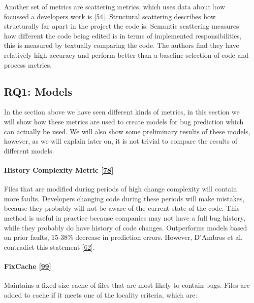 \documentclass[]{book}
\let\oldparagraph\paragraph
\renewcommand{\paragraph}[1]{\oldparagraph{#1}\mbox{}}
\begin{document}
Another set of metrics are scattering metrics, which uses data about how
focussed a developers work is
{[}\protect\hyperlink{ref-DiNucci2018}{54}{]}. Structural scattering
describes how structurally far apart in the project the code is.
Semantic scattering measures how different the code being edited is in
terms of implemented responsibilities, this is measured by textually
comparing the code. The authors find they have relatively high accuracy
and perform better than a baseline selection of code and process
metrics.

\subsection{RQ1: Models}\label{rq1-models}

In the section above we have seen different kinds of metrics, in this
section we will show how these metrics are used to create models for bug
prediction which can actually be used. We will also show some
preliminary results of these models, however, as we will explain later
on, it is not trivial to compare the results of different models.

\paragraph{\texorpdfstring{History Complexity Metric
{[}\protect\hyperlink{ref-hassan2009}{78}{]}}{History Complexity Metric {[}78{]}}}\label{history-complexity-metric-hassan2009}

Files that are modified during periods of high change complexity will
contain more faults. Developers changing code during these periods will
make mistakes, because they probably will not be aware of the current
state of the code. This method is useful in practice because companies
may not have a full bug history, while they probably do have history of
code changes. Outperforms models based on prior faults, 15-38\% decrease
in prediction errors. However, D'Ambros et al. contradict this statement
{[}\protect\hyperlink{ref-DAmbros2010}{62}{]}.

\paragraph{\texorpdfstring{FixCache
{[}\protect\hyperlink{ref-kim2007}{99}{]}}{FixCache {[}99{]}}}\label{fixcache-kim2007}

Maintains a fixed-size cache of files that are most likely to contain
bugs. Files are added to cache if it meets one of the locality criteria,
which are:
\end{document}
